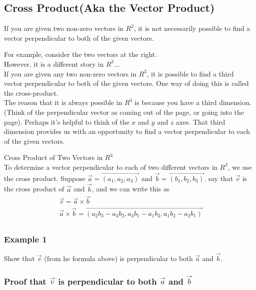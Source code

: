 \documentclass{article}
\begin{document}
\newpage 
\subsection{Cross Product(Aka the Vector Product)}
If you are given two non-zero vectors in $R^2$, it is not necessarily possible to find a vector perpendicular to both of the given vectors.

For example, consider the two vectors at the right.\\

However, it is a different story in $R^3 \ldots$\\

If you are given any two non-zero vectors in $R^3$, it is possible to find a third vector perpendicular to both of the given vectors. One way of doing this is called the cross-product.\\

The reason that it is always possible in $R^3$ is because you have a third dimension. (Think of the perpendicular vector as coming out of the page, or going into the page). Perhaps it's helpful to think of the $x$ and $y$ and $z$ axes. That third dimension provides us with an opportunity to find a vector perpendicular to each of the given vectors.\\
\begin{tcolorbox}[enhanced,frame style image=blueshade.png,
  opacityback=0.75,opacitybacktitle=0.25,
  colback=blue!5!white,colframe=blue!75!black] 
Cross Product of Two Vectors in $R^3$\\
To determine a vector perpendicular to each of two different vectors in $R^3$, we use the cross product.
Suppose $\vec{a}=\overrightarrow{\left(a_1, a_2, a_3\right)}$ and $\vec{b}=\overrightarrow{\left(b_1, b_2, b_3\right)}$. say that $\vec{v}$ is the cross product of $\vec{a}$ and $\vec{b}$, and we can write this as
$$
\begin{aligned}
& \vec{v}=\vec{a} \times \vec{b} \\
& \vec{a} \times \vec{b}=\overrightarrow{\left(a_2 b_3-a_3 b_2, a_3 b_1-a_1 b_3, a_1 b_2-a_2 b_1\right)} \\
&
\end{aligned}
$$
\end{tcolorbox}
\subsubsection*{Example 1}
Show that $\vec{v}$ (from he formula above) is perpendicular to both $\vec{a}$ and $\vec{b}$.
\subsubsection*{Proof that $\vec{v}$ is perpendicular to both $\vec{a}$ and $\vec{b}$}
\end{document}

